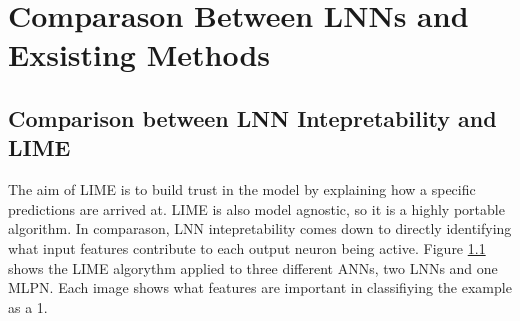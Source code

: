 \section{Comparason Between LNNs and Exsisting Methods}
\subsection{Comparison between LNN Intepretability and LIME}
The aim of LIME is to build trust in the model by explaining how a specific predictions are arrived at. LIME is also model agnostic, so it is a highly portable algorithm.  In comparason, LNN intepretability comes down to directly identifying what input features contribute to each output neuron being active. Figure \ref{} shows the LIME algorythm applied to three different ANNs, two LNNs and one MLPN. Each image shows what features are important in classifiying the example as a 1.

